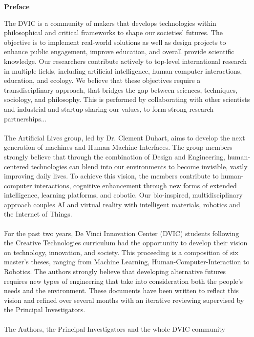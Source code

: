 
\begin{center}
	\Large \textbf{Preface}
\end{center}
\vspace{0.5cm}
The \gls*{DVIC} is a community of makers that develops technologies
within philosophical and critical frameworks to shape our societies’
futures. The objective is to implement real-world solutions as well as
design projects to enhance public engagement, improve education, and
overall provide scientific knowledge. Our researchers contribute actively
to top-level international research in multiple fields, including artificial
intelligence, human-computer interactions, education, and ecology. We
believe that these objectives require a transdisciplinary approach, that
bridges the gap between sciences, techniques, sociology, and philosophy.
This is performed by collaborating with other scientists and industrial and
startup sharing our values, to form strong research partnerships...\\
\\
The Artificial Lives group, led by Dr. Clement Duhart, aims to develop
the next generation of machines and Human-Machine Interfaces.
The group members strongly believe that through the combination of
Design and Engineering, human-centered technologies can blend into our
environments to become invisible, vastly improving daily lives. To achieve
this vision, the members contribute to human-computer interactions,
cognitive enhancement through new forms of extended intelligence,
learning platforms, and cobotic. Our bio-inspired, multidisciplinary
approach couples AI and virtual reality with intelligent materials, robotics
and the Internet of Things.\\
\\
For the past two years, De Vinci Innovation Center (DVIC) students
following the Creative Technologies curriculum had the opportunity to
develop their vision on technology, innovation, and society.
This proceeding is a composition of six master’s theses, ranging
from Machine Learning, Human-Computer-Interaction to Robotics. The
authors strongly believe that developing alternative futures requires
new types of engineering that take into consideration both the people’s
needs and the environment. These documents have been written to reflect
this vision and refined over several months with an iterative reviewing
supervised by the Principal Investigators.\\
\\
The Authors, the Principal Investigators and the whole DVIC community

